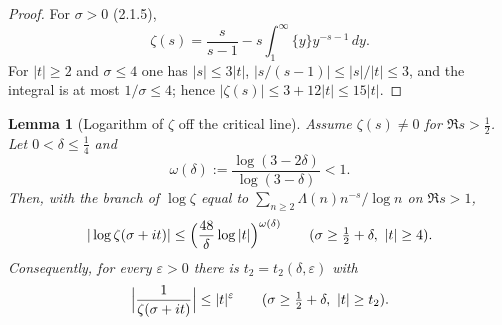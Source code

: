 \documentclass[11pt,reqno]{amsart}
\makeatletter
\let\CG@origcite\cite
\renewcommand*{\cite}[2][]{\def\CG@citekey{#2}%
  \ifx\relax#1\relax\CG@origcite{#2}\else\CG@origcite[#1]{#2}\fi}
\numberwithin{equation}{section}
\theoremstyle{plain}
\newtheorem{lemma}[theorem]{Lemma}
\theoremstyle{definition}
\theoremstyle{remark}
\newcommand{\eps}{\varepsilon}
\makeatother
\begin{document}
\begin{proof}
For $\sigma>0$ \cite[(2.1.5)]{Titchmarsh1986},
\begin{equation}\label{eq:zeta-integral-rep}
 \zeta(s)=\frac s{s-1}-s\int_1^\infty\{y\}y^{-s-1}\,dy .
\end{equation}
For $|t|\ge2$ and $\sigma\le4$ one has $|s|\le3|t|$, $|s/(s-1)|\le|s|/|t|\le3$, and the integral is at most $1/\sigma\le4$; hence $|\zeta(s)|\le3+12|t|\le15|t|$.
\end{proof}

\begin{lemma}[Logarithm of $\zeta$ off the critical line]\label{lem:log-zeta}
Assume $\zeta(s)\ne0$ for $\Re s>\tfrac12$.  Let $0<\delta\le\tfrac14$ and
\begin{equation}\label{eq:three-circles-exponent}
 \omega(\delta):=\frac{\log(3-2\delta)}{\log(3-\delta)}<1 .
\end{equation}
Then, with the branch of $\log\zeta$ equal to $\sum_{n\ge2}\Lambda(n)n^{-s}/\log n$ on $\Re s>1$,
\begin{equation}\label{eq:log-zeta-bound}
 |\log\zeta(\sigma+it)|\le\Bigl(\frac{48}\delta\log|t|\Bigr)^{\omega(\delta)}\qquad(\sigma\ge\tfrac12+\delta,\ |t|\ge4).
\end{equation}
Consequently, for every $\eps>0$ there is $t_2=t_2(\delta,\eps)$ with
\begin{equation}\label{eq:inv-zeta-bound}
 \Bigl|\frac1{\zeta(\sigma+it)}\Bigr|\le|t|^{\eps}\qquad(\sigma\ge\tfrac12+\delta,\ |t|\ge t_2).
\end{equation}
\end{lemma}
\end{document}
